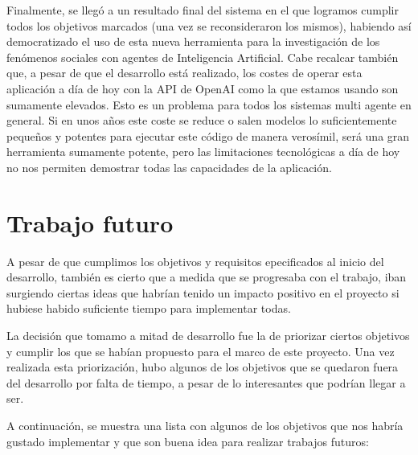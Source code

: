 Finalmente, se llegó a un resultado final del sistema en el que logramos cumplir todos los objetivos marcados (una vez se reconsideraron los mismos), habiendo así democratizado el uso de esta nueva herramienta para la investigación de los fenómenos sociales con agentes de Inteligencia Artificial. Cabe recalcar también que, a pesar de que el desarrollo está realizado, los costes de operar esta aplicación a día de hoy con la API de OpenAI como la que estamos usando son sumamente elevados. Esto es un problema para todos los sistemas multi agente en general. Si en unos años este coste se reduce o salen modelos lo suficientemente pequeños y potentes para ejecutar este código de manera verosímil, será una gran herramienta sumamente potente, pero las limitaciones tecnológicas a día de hoy no nos permiten demostrar todas las capacidades de la aplicación.

\section{Trabajo futuro}

A pesar de que cumplimos los objetivos y requisitos epecificados al inicio del desarrollo, también es cierto que a medida que se progresaba con el trabajo, iban surgiendo ciertas ideas que habrían tenido un impacto positivo en el proyecto si hubiese habido suficiente tiempo para implementar todas.

La decisión que tomamo a mitad de desarrollo fue la de priorizar ciertos objetivos y cumplir los que se habían propuesto para el marco de este proyecto. Una vez realizada esta priorización, hubo algunos de los objetivos que se quedaron fuera del desarrollo por falta de tiempo, a pesar de lo interesantes que podrían llegar a ser.

A continuación, se muestra una lista con algunos de los objetivos que nos habría gustado implementar y que son buena idea para realizar trabajos futuros:

